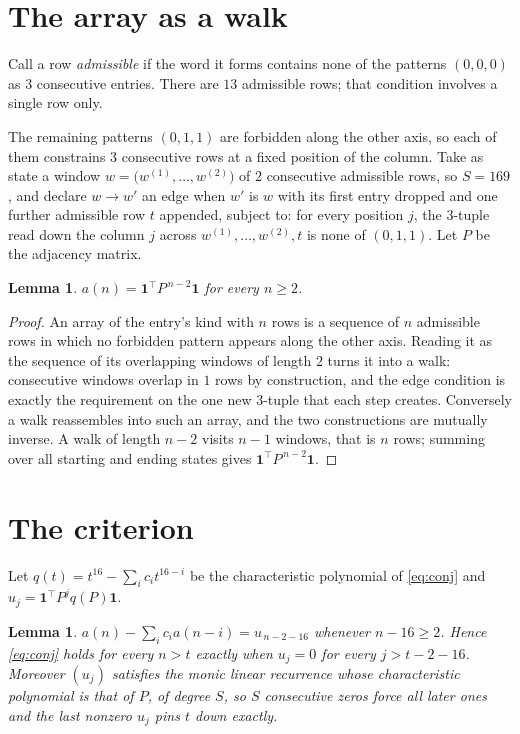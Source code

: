 \documentclass[11pt,a4paper]{article}
\theoremstyle{plain}
\newtheorem{lemma}[theorem]{Lemma}
\theoremstyle{definition}
\begin{document}
\section{The array as a walk}

Call a row \emph{admissible} if the word it forms contains none of the patterns
$(0,0,0)$ as $3$ consecutive entries. There are $13$ admissible rows; that condition
involves a single row only.

The remaining patterns $(0,1,1)$ are forbidden along the other axis, so each of them
constrains $3$ consecutive rows at a fixed position of the column. Take as state a
window $w=\bigl(w^{(1)},\dots,w^{(2)}\bigr)$ of $2$ consecutive admissible
rows, so $S=169$, and declare $w\to w'$ an edge when $w'$ is $w$ with its first entry
dropped and one further admissible row $t$ appended, subject to: for every position
$j$, the $3$-tuple read down the column $j$ across $w^{(1)},\dots,w^{(2)},t$
is none of $(0,1,1)$. Let $P$ be the adjacency matrix.

\begin{lemma}\label{lem:walk}
$a(n)=\mathbf{1}^{\!\top}P^{\,n-2}\mathbf{1}$ for every $n\ge2$.
\end{lemma}

\begin{proof}
An array of the entry's kind with $n$ rows is a sequence of $n$ admissible rows in
which no forbidden pattern appears along the other axis. Reading it as the sequence of its
overlapping windows of length $2$ turns it into a walk: consecutive windows overlap in
$1$ rows by construction, and the edge condition is exactly the requirement on the one
new $3$-tuple that each step creates. Conversely a walk reassembles into such an array,
and the two constructions are mutually inverse. A walk of length $n-2$ visits $n-1$
windows, that is $n$ rows; summing over all starting and ending states gives
$\mathbf{1}^{\!\top}P^{\,n-2}\mathbf{1}$.
\end{proof}

\section{The criterion}

Let $q(t)=t^{16}-\sum_i c_i t^{16-i}$ be the characteristic polynomial of
\eqref{eq:conj} and $u_j=\mathbf{1}^{\!\top}P^{j}q(P)\mathbf{1}$.

\begin{lemma}\label{lem:crit}
$a(n)-\sum_i c_i a(n-i)=u_{\,n-2-16}$ whenever $n-16\ge2$. Hence
\eqref{eq:conj} holds for every $n>t$ exactly when $u_j=0$ for every
$j>t-2-16$. Moreover $(u_j)$ satisfies the monic linear recurrence whose
characteristic polynomial is that of $P$, of degree $S$, so $S$ consecutive zeros force all
later ones and the last nonzero $u_j$ pins $t$ down exactly.
\end{lemma}
\end{document}
